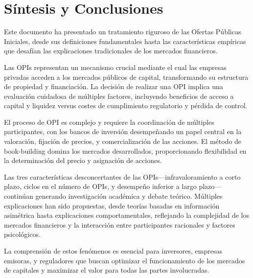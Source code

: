 \section{Síntesis y Conclusiones}

Este documento ha presentado un tratamiento riguroso de las Ofertas Públicas Iniciales, desde sus definiciones fundamentales hasta las características empíricas que desafían las explicaciones tradicionales de los mercados financieros.

Las OPIs representan un mecanismo crucial mediante el cual las empresas privadas acceden a los mercados públicos de capital, transformando su estructura de propiedad y financiación. La decisión de realizar una OPI implica una evaluación cuidadosa de múltiples factores, incluyendo beneficios de acceso a capital y liquidez versus costes de cumplimiento regulatorio y pérdida de control.

El proceso de OPI es complejo y requiere la coordinación de múltiples participantes, con los bancos de inversión desempeñando un papel central en la valoración, fijación de precios, y comercialización de las acciones. El método de book-building domina los mercados desarrollados, proporcionando flexibilidad en la determinación del precio y asignación de acciones.

Las tres características desconcertantes de las OPIs—infravaloramiento a corto plazo, ciclos en el número de OPIs, y desempeño inferior a largo plazo—continúan generando investigación académica y debate teórico. Múltiples explicaciones han sido propuestas, desde teorías basadas en información asimétrica hasta explicaciones comportamentales, reflejando la complejidad de los mercados financieros y la interacción entre participantes racionales y factores psicológicos.

La comprensión de estos fenómenos es esencial para inversores, empresas emisoras, y reguladores que buscan optimizar el funcionamiento de los mercados de capitales y maximizar el valor para todas las partes involucradas.



